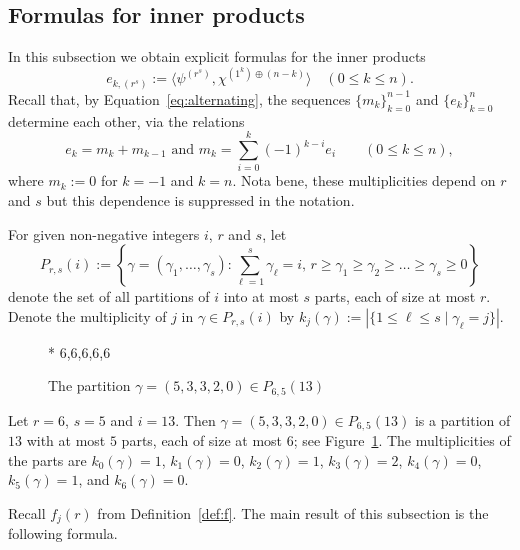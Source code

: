 \documentclass[ALCO,published]{cedram}
\begin{document}
	
\subsection{Formulas for inner products}\label{sec:e}
	
In this subsection we obtain explicit formulas for the inner products 
\[
    e_{k,(r^s)} := \langle \psi^{(r^s)}, \chi^{(1^k) \oplus (n-k)} \rangle
    \quad (0 \le k \le n).
\]
Recall that, by Equation~\eqref{eq:alternating}, 
the sequences $\{m_k\}_{k=0}^{n-1}$ and $\{e_k\}_{k=0}^{n}$ 
determine each other, via the relations
\[
    e_k = m_k+m_{k-1}
    \text{ and }
    m_k = \sum_{i=0}^k (-1)^{k-i} e_i
    \qquad (0 \le k \le n),
\]
where $m_k := 0$ for $k = -1$ and $k = n$.
Nota bene, these multiplicities depend on $r$ and $s$
but this dependence is suppressed in the notation.

\begin{definition}\label{def:partition}
    For given non-negative integers $i$, $r$ and $s$, let
    \[
        P_{r,s}(i) 
        := \left\{ \gamma=(\gamma_1,\ldots,\gamma_s) :
        \sum_{\ell = 1}^{s} \gamma_\ell = i,\, r \ge \gamma_1 \ge \gamma_2 \ge \ldots \ge \gamma_s \ge 0 \right\}
    \]
    denote the set of all partitions of $i$ into at most $s$ parts, each of size at most $r$. 
    Denote the multiplicity of $j$ in $\gamma \in P_{r,s}(i)$ by 
    $k_j(\gamma) := |\{1 \leq \ell \leq s \mid \gamma_\ell=j\}|$.
\end{definition}
	
\begin{figure}
     * {6,6,6,6,6}
    \caption{The partition $\gamma = (5,3,3,2,0) \in P_{6,5}(13)$}
	\label{fig:subpart}
\end{figure}
	
\begin{example}
    Let $r=6$, $s=5$ and $i=13$. 
    Then $\gamma=(5,3,3,2,0)\in P_{6,5}(13)$ is a partition of $13$ with at most $5$ parts, each of size at most $6$; 
    see Figure~\ref{fig:subpart}. 
    The multiplicities of the parts are 
    $k_0(\gamma) = 1$, 
    $k_1(\gamma) = 0$, 
    $k_2(\gamma) = 1$, 
    $k_3(\gamma) = 2$, 
    $k_4(\gamma) = 0$, 
    $k_5(\gamma) = 1$, 
    and $k_6(\gamma) = 0$.
\end{example}

Recall $f_j(r)$ from Definition~\ref{def:f}. 
The main result of this subsection is the following formula.
\end{document}
